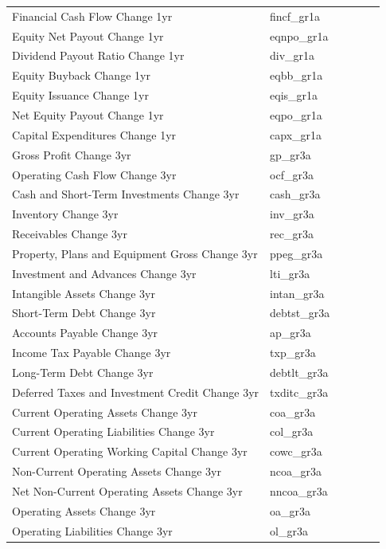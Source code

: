 \documentclass[12pt,title,fleqn]{article}
\begin{document}
\begin{longtable}{p{5cm}p{2cm}p{5cm}lll}
Financial Cash Flow Change 1yr & fincf\_gr1a & & & & \\
Equity Net Payout Change 1yr & eqnpo\_gr1a & & & & \\
Dividend Payout Ratio Change 1yr & div\_gr1a & & & & \\
Equity Buyback Change 1yr & eqbb\_gr1a & & & & \\
Equity Issuance Change 1yr & eqis\_gr1a & & & & \\
Net Equity Payout Change 1yr & eqpo\_gr1a & & & & \\
Capital Expenditures Change 1yr & capx\_gr1a & & & & \\
Gross Profit Change 3yr & gp\_gr3a & & & & \\
Operating Cash Flow Change 3yr & ocf\_gr3a & & & & \\
Cash and Short-Term Investments Change 3yr & cash\_gr3a & & & & \\
Inventory Change 3yr & inv\_gr3a & & & & \\
Receivables Change 3yr & rec\_gr3a & & & & \\
Property, Plans and Equipment Gross Change 3yr & ppeg\_gr3a & & & & \\
Investment and Advances Change 3yr & lti\_gr3a & & & & \\
Intangible Assets Change 3yr & intan\_gr3a & & & & \\
Short-Term Debt Change 3yr & debtst\_gr3a & & & & \\
Accounts Payable Change 3yr & ap\_gr3a & & & & \\
Income Tax Payable Change 3yr & txp\_gr3a & & & & \\
Long-Term Debt Change 3yr & debtlt\_gr3a & & & & \\
Deferred Taxes and Investment Credit Change 3yr & txditc\_gr3a & & & & \\
Current Operating Assets Change 3yr & coa\_gr3a & & & & \\
Current Operating Liabilities Change 3yr & col\_gr3a & & & & \\
Current Operating Working Capital Change 3yr & cowc\_gr3a & & & & \\
Non-Current Operating Assets Change 3yr & ncoa\_gr3a & & & & \\
Net Non-Current Operating Assets Change 3yr & nncoa\_gr3a & & & & \\
Operating Assets Change 3yr & oa\_gr3a & & & & \\
Operating Liabilities Change 3yr & ol\_gr3a & & & & \\

\end{longtable}
\end{document}
